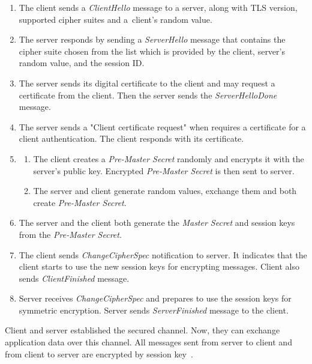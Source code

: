 \documentclass[
  12pt, 
  digital, %
  notable,   %
  nolof,     %
  nolot,     %
]{fithesis3}
\begin{document}
\begin{enumerate}
\item The client sends a \textit{ClientHello} message to a server, along with TLS version, supported cipher suites and a~client's random value.
\item The server responds by sending a \textit{ServerHello} message that contains the cipher suite chosen from the list which is provided by the client, server's random value, and the session ID. 
\item The server sends its digital certificate to the client and may request a certificate from the client. Then the server sends the \textit{ServerHelloDone} message.
\item The server sends a "Client certificate request" when requires a certificate for a client authentication. The client responds with its certificate.
\item 
\begin{enumerate}
\item The client creates a \textit{Pre-Master Secret} randomly and encrypts it with the server's public key. Encrypted \textit{Pre-Master Secret} is then sent to server. 
\item The server and client generate random values, exchange them and both create \textit{Pre-Master Secret}.
\end{enumerate} 
\item The server and the client both generate the \textit{Master Secret} and session keys from the \textit{Pre-Master Secret}.
\item The client sends \textit{ChangeCipherSpec} notification to server. It indicates that the client starts to use the new session keys for encrypting messages. Client also sends \textit{ClientFinished} message.
\item Server receives \textit{ChangeCipherSpec} and prepares to use the session keys for symmetric encryption. Server sends \textit{ServerFinished} message to the client.
\end{enumerate}

Client and server established the secured channel. Now, they can exchange application data over this channel. All messages sent from server to client and from client to server are encrypted by session key~\cite{ibm, handshakeprotocol}.
\end{document}
